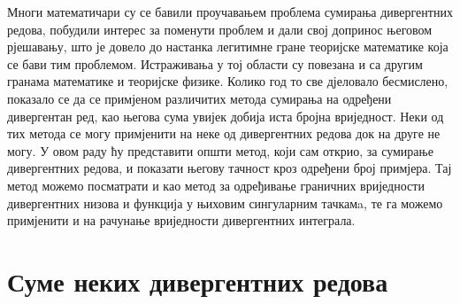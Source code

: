 \documentclass[12pt]{article}
\begin{document}
Многи математичари су се бавили проучавањем проблема сумирања дивергентних редова, побудили интерес за поменути проблем и дали свој допринос његовом рјешавању, што је довело до настанка легитимне гране теоријске математике која се бави тим проблемом. Истраживања у тој области су повезана и са другим гранама математике и теоријске физике.
Колико год то све дјеловало бесмислено, показало се да се примјеном различитих метода сумирања на одређени дивергентан ред, као његова сума увијек добија иста бројна вриједност. Неки од тих метода се могу примјенити на неке од дивергентних редова док на друге не могу. У овом раду ћу представити општи метод, који сам открио, за сумирање дивергентних редова, и показати његову тачност кроз одређени број примјера. Тај метод можемо посматрати и као метод за одређивање граничних вриједности дивергентних низова и функција у њиховим сингуларним тачкамa, те га можемо примјенити и на рачунање вриједности дивергентних интеграла.

\section{Суме неких дивергентних редова}
\end{document}
